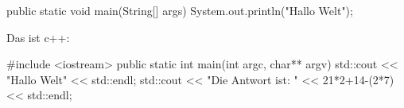 \documentclass{article}
\begin{document}
\begin{java}
public static void main(String[] args) {
    System.out.println("Hallo Welt");
}
\end{java}
Das ist c++:
\begin{cpp}
#include <iostream>
public static int main(int argc, char** argv) {
    std::cout << "Hallo Welt" << std::endl;
    std::cout << "Die Antwort ist: " << 21*2+14-(2*7) << std::endl;
}
\end{cpp}
\end{document}
